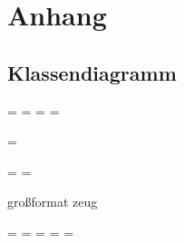 \chapter{Anhang}

	\section{Klassendiagramm}
	
	
	
	\newpage
		
	\paperwidth=\pdfpageheight
	\paperheight=\pdfpagewidth
	\pdfpageheight=\paperheight
	\pdfpagewidth=\paperwidth
	\textheight
	
	\begingroup 
	\vsize=\textwidth
	\textheight
	
	\textwidth=\hsize
	\textheight=\vsize
		
		
	großformat zeug
	
	

	
	
	
    \endgroup
	\newpage
	\paperwidth=\pdfpageheight
	\paperheight=\pdfpagewidth
	\pdfpageheight=\paperheight
	\pdfpagewidth=\paperwidth
	\headwidth=\textwidth
	
